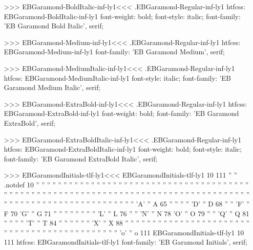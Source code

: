 >>>
\<EBGaramond-BoldItalic-inf-ly1\><<<
.EBGaramond-Regular-inf-ly1
htfcss:  EBGaramond-BoldItalic-inf-ly1  font-weight: bold; font-style: italic; font-family: 'EB Garamond Bold Italic', serif;

>>>
\<EBGaramond-Medium-inf-ly1\><<<
.EBGaramond-Regular-inf-ly1
htfcss:  EBGaramond-Medium-inf-ly1  font-family: 'EB Garamond Medium', serif;

>>>
\<EBGaramond-MediumItalic-inf-ly1\><<<
.EBGaramond-Regular-inf-ly1
htfcss:  EBGaramond-MediumItalic-inf-ly1  font-style: italic; font-family: 'EB Garamond Medium Italic', serif;

>>>
\<EBGaramond-ExtraBold-inf-ly1\><<<
.EBGaramond-Regular-inf-ly1
htfcss:  EBGaramond-ExtraBold-inf-ly1  font-weight: bold; font-family: 'EB Garamond ExtraBold', serif;

>>>
\<EBGaramond-ExtraBoldItalic-inf-ly1\><<<
.EBGaramond-Regular-inf-ly1
htfcss:  EBGaramond-ExtraBoldItalic-inf-ly1  font-weight: bold; font-style: italic; font-family: 'EB Garamond ExtraBold Italic', serif;

>>>
\<EBGaramondInitials-tlf-ly1\><<<
EBGaramondInitials-tlf-ly1 10 111
'' '' .notdef 10
'' ''  
'' ''  
'' ''  
'' ''  
'' ''  
'' ''  
'' ''  
'' ''  
'' ''  
'' ''  
'' ''  
'' ''  
'' ''  
'' ''  
'' ''  
'' ''  
'' ''  
'' ''  
'' ''  
'' ''  
'' ''  
'' ''  
'' ''  
'' ''  
'' ''  
'' ''  
'' ''  
'' ''  
'' ''  
'' ''  
'' ''  
'' ''  
'' ''  
'' ''  
'' ''  
'' ''  
'' ''  
'' ''  
'' ''  
'' ''  
'' ''  
'' ''  
'' ''  
'' ''  
'' ''  
'' ''  
'' ''  
'' ''  
'' ''  
'' ''  
'' ''  
'' ''  
'' ''  
'' ''  
'A' '' A 65
'' ''  
'' ''  
'D' '' D 68
'' ''  
'F' '' F 70
'G' '' G 71
'' ''  
'' ''  
'' ''  
'' ''  
'L' '' L 76
'' ''  
'N' '' N 78
'O' '' O 79
'' ''  
'Q' '' Q 81
'' ''  
'' ''  
'T' '' T 84
'' ''  
'' ''  
'' ''  
'X' '' X 88
'' ''  
'' ''  
'' ''  
'' ''  
'' ''  
'' ''  
'' ''  
'' ''  
'' ''  
'' ''  
'' ''  
'' ''  
'' ''  
'' ''  
'' ''  
'' ''  
'' ''  
'' ''  
'' ''  
'' ''  
'' ''  
'' ''  
'o' '' o 111
EBGaramondInitials-tlf-ly1 10 111
htfcss:  EBGaramondInitials-tlf-ly1  font-family: 'EB Garamond Initials', serif;

